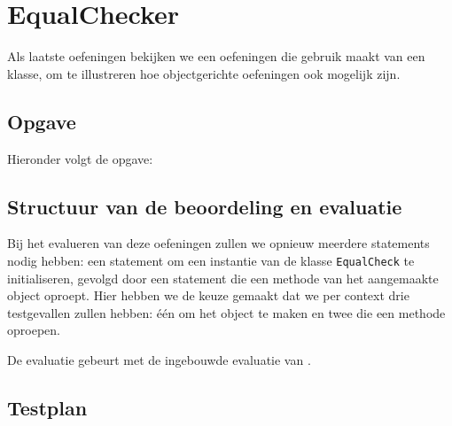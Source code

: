 \section{EqualChecker}\label{sec:oefening-equal}

Als laatste oefeningen bekijken we een oefeningen die gebruik maakt van een klasse, om te illustreren hoe objectgerichte oefeningen ook mogelijk zijn.

\subsection{Opgave}\label{subsec:oefeningen-equal-opgave}

Hieronder volgt de opgave:

\begin{quote}
\end{quote}

\subsection{Structuur van de beoordeling en evaluatie}\label{subsec:oefening-equal-structuur}

Bij het evalueren van deze oefeningen zullen we opnieuw meerdere statements nodig hebben: een statement om een instantie van de klasse \texttt{EqualCheck} te initialiseren, gevolgd door een statement die een methode van het aangemaakte object oproept.
Hier hebben we de keuze gemaakt dat we per context drie testgevallen zullen hebben: één om het object te maken en twee die een methode oproepen.

De evaluatie gebeurt met de ingebouwde evaluatie van \tested{}.

\subsection{Testplan}\label{subsec:oefening-equal-testplan}

